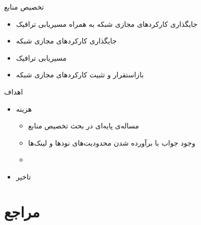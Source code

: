 \documentclass{beamer}
\makeatletter
\newcommand{\RTList}{\raggedleft\rightskip\@totalleftmargin}
\makeatother
\begin{document}
\begin{persian}
  \begin{frame}{تخصیص منابع}
    \begin{itemize}\RTList{}
      \justifying
      \item
            جایگذاری کارکردهای مجازی شبکه به همراه مسیریابی ترافیک\\
            \begin{center}\footnotesize{}\end{center}
      \item
            جایگذاری کارکردهای مجازی شبکه\\
            \begin{center}\footnotesize{}\end{center}
      \item
            مسیریابی ترافیک\\
            \begin{center}\footnotesize{}\end{center}
      \item
            بازاستقرار و تثبیت کارکردهای مجازی شبکه\\
            \begin{center}\footnotesize{}\end{center}
    \end{itemize}
  \end{frame}

  \begin{frame}{اهداف}
    \begin{itemize}\RTList{}
      \justifying
      \item هزینه
      \begin{itemize}\RTList{}
        \justifying
        \item مساله‌ی پایه‌ای در بحث تخصیص منابع
        \item وجود جواب با برآورده شدن محدودیت‌های نودها و لینک‌ها
        \item {}
      \end{itemize}
      \item تاخیر
    \end{itemize}
  \end{frame}

  \section{مراجع}

  \begin{frame}{}
    \printbibliography%
  \end{frame}

\end{persian}
\end{document}
